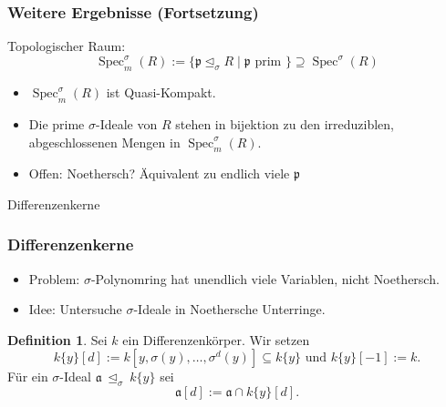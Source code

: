 \documentclass{beamer}
\def\a{\mathfrak{a}}
\def\p{\mathfrak{p}}
\def\s{\sigma}
\def\si{\unlhd_{\sigma}}
\def\Spec{\operatorname{Spec}}
\def\sSpec{\operatorname{Spec}^\sigma_m}
\newcommand{\catname}[1]{{\normalfont\textbf{#1}}}
\newcommand{\sringk}{\s\text{\catname{-ring}}_k}
\theoremstyle{definition}
\newtheorem{prop}[satz]{Proposition}
\newtheorem{defn}[satz]{Definition}
\begin{document}
\begin{frame}\frametitle{Weitere Ergebnisse (Fortsetzung)}
Topologischer Raum: $$\sSpec(R):= \{ \p \si R \mid \p \text{ prim }\} \supseteq \Spec^\s(R)$$

\begin{itemize}
\item $\sSpec(R)$ ist Quasi-Kompakt.
\item Die prime $\s$-Ideale von $R$ stehen in bijektion zu den irreduziblen, abgeschlossenen Mengen in $\sSpec(R)$.
\item Offen: Noethersch? Äquivalent zu endlich viele $\p$
\end{itemize}
\end{frame}


\begin{frame}
\begin{center}
\LARGE Differenzenkerne
\end{center}
\end{frame}

\begin{frame}\frametitle{Differenzenkerne}
\begin{itemize}
\item Problem: $\s$-Polynomring hat unendlich viele Variablen, nicht Noethersch. 
\item Idee: Untersuche $\s$-Ideale in Noethersche Unterringe.
\end{itemize}
\begin{defn}
Sei $k$ ein Differenzenkörper. Wir setzen $$k\{y\}[d]:= k[y,\s(y),\ldots,\s^d(y)] \subseteq k\{y\} \text{ und }k\{y\}[-1] := k.$$
 Für ein $\s$-Ideal $\a~\si~k\{y\}$ sei $$\a[d] := \a \cap k\{y\}[d].$$
\end{defn}
\end{frame}
\end{document}
